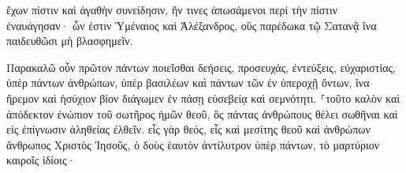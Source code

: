 \documentclass{openreader}
\begin{document}
ἔχων πίστιν καὶ ἀγαθὴν συνείδησιν, ἥν τινες ἀπωσάμενοι περὶ τὴν πίστιν ἐναυάγησαν· 
ὧν ἐστιν Ὑμέναιος καὶ Ἀλέξανδρος, οὓς παρέδωκα τῷ Σατανᾷ ἵνα παιδευθῶσι μὴ βλασφημεῖν. 

Παρακαλῶ οὖν πρῶτον πάντων ποιεῖσθαι δεήσεις, προσευχάς, ἐντεύξεις, εὐχαριστίας, ὑπὲρ πάντων ἀνθρώπων, 
ὑπὲρ βασιλέων καὶ πάντων τῶν ἐν ὑπεροχῇ ὄντων, ἵνα ἤρεμον καὶ ἡσύχιον βίον διάγωμεν ἐν πάσῃ εὐσεβείᾳ καὶ σεμνότητι. 
⸀τοῦτο καλὸν καὶ ἀπόδεκτον ἐνώπιον τοῦ σωτῆρος ἡμῶν θεοῦ, 
ὃς πάντας ἀνθρώπους θέλει σωθῆναι καὶ εἰς ἐπίγνωσιν ἀληθείας ἐλθεῖν. 
εἷς γὰρ θεός, εἷς καὶ μεσίτης θεοῦ καὶ ἀνθρώπων ἄνθρωπος Χριστὸς Ἰησοῦς, 
ὁ δοὺς ἑαυτὸν ἀντίλυτρον ὑπὲρ πάντων, τὸ μαρτύριον καιροῖς ἰδίοις· 
\end{document}
